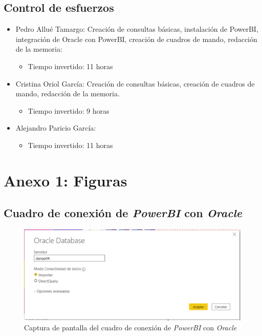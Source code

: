 \documentclass{article}
\begin{document}
\subsection{Control de esfuerzos}
\begin{itemize}
    \item Pedro Allué Tamargo: Creación de consultas básicas, instalación de PowerBI, integración de Oracle con PowerBI, creación de cuadros de mando, redacción de la memoria:
        \begin{itemize}
            \item Tiempo invertido: 11 horas
        \end{itemize}
    \item Cristina Oriol García: Creación de consultas básicas, creación de cuadros de mando, redacción de la memoria. 
        \begin{itemize}
            \item Tiempo invertido: 9 horas
        \end{itemize}
    \item Alejandro Paricio García:
        \begin{itemize}
            \item Tiempo invertido: 11 horas
        \end{itemize}
\end{itemize}

\newpage
\section{Anexo 1: Figuras}

\subsection{Cuadro de conexión de \textit{PowerBI} con \textit{Oracle}}

\begin{figure}[h!]
    \centering
    \includegraphics[scale=0.8]{images/cuadroConexion.png}
    \caption{Captura de pantalla del cuadro de conexión de \textit{PowerBI} con \textit{Oracle}}
    \label{fig:cuadroConexion}
\end{figure}
\end{document}
